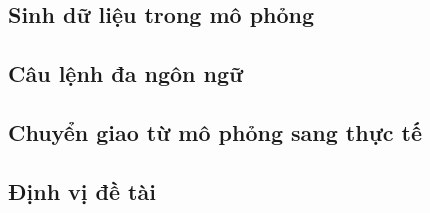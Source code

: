 \subsection{Sinh dữ liệu trong mô phỏng}

\subsection{Câu lệnh đa ngôn ngữ}

\subsection{Chuyển giao từ mô phỏng sang thực tế}

\subsection{Định vị đề tài}
